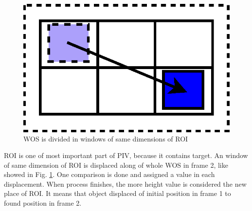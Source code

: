 \begin{figure}[H]
\includegraphics[width=\columnwidth]{images/WOSdivided.eps}
\caption{WOS is divided in windows of same dimensions of ROI}
\label{fig:WOSdivided}
\end{figure}

ROI is one of most important part of PIV, because it contains target. An window of same dimension of ROI is displaced
along of whole WOS in frame 2, like showed in Fig. \ref{fig:WOSdivided}. One comparison is done and assigned a value in each displacement. 
When process finishes, the more height value is considered the new place of ROI. It means that object displaced of initial 
position in frame 1 to found position in frame 2.